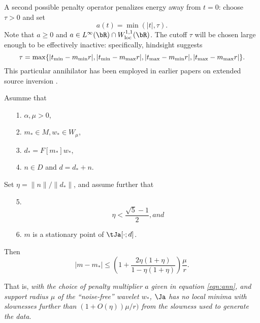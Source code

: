 A second possible 
penalty operator penalizes energy away from 
$t=0$: choose $\tau > 0$ and set 
\begin{equation}
  \label{eqn:ann}
  a(t) = \min(|t|, \tau). 
\end{equation}
Note that $a \ge 0$ and $a \in L^{\infty}(\bR) \cap W^{1,1}_{\rm
  loc}(\bR)$. The cutoff $\tau$ will be chosen large enough to be effectively inactive: 
specifically, hindsight suggests 
\begin{equation}
  \label{eqn:taudef}
  \tau = \max\{|t_{\rm min}-m_{\rm min}r|,|t_{\rm min}-m_{\rm max}r|, |t_{\rm max}-m_{\rm min}r|, |t_{\rm max}-m_{\rm max}r|\}. 
\end{equation}
This 
particular annihilator has been employed in earlier papers on extended 
source inversion 
\cite[]{Plessix:00a,LuoSava:11,Warner:14,HuangSymes:SEG15a,Warner:16,HuangSymes:GEO17}.

\begin{theorem}
  \label{thm:mnoiseres}
  Asumme that
  \begin{itemize}
  \item[1. ] $\alpha, \mu> 0$,
  \item[2. ] $m_* \in M, w_* \in W_{\mu}$,
  \item[3. ] $d_* = F[m_*]w_*$,
  \item[4. ] $n \in D$ and $d = d_* + n$.
  \end{itemize}
  Set $\eta = \|n\|/\|d_*\|$, and assume further that
  \begin{itemize}
  \item[5. ]
    \begin{equation}
      \label{eqn:mnoisecond}
      \eta < \frac{\sqrt{5}-1}{2}, and
    \end{equation}
  \item[6. ] $m$ is a stationary point of $\tJa[\cdot;d]$.
  \end{itemize}
  Then
  \begin{equation}
    \label{eqn:mnoisesuff}
    |m-m_*| \le \left(1+\frac{2\eta(1+\eta)}{1-\eta(1+\eta)}\right)\frac{\mu}{r}.
  \end{equation}
\end{theorem}

 That is, {\em with the choice of penalty
  multiplier $a$ given in equation \ref{eqn:ann}, and support radius
  $\mu$ of the ``noise-free'' wavelet $w_*$, $\Ja$ has no local
  minima with slownesses further than $(1+O(\eta))\mu/r)$ from the slowness used to
  generate the data}.


